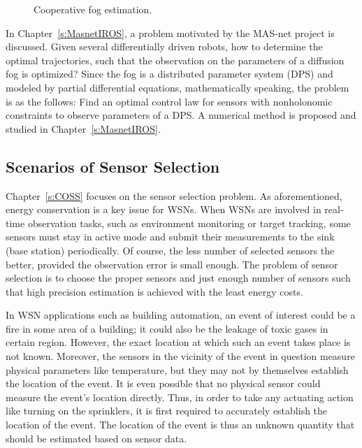 \begin{figure}
\centering
\caption{Cooperative fog estimation.\label{f:CoopFog}}
\end{figure}

In Chapter~\ref{s:MasnetIROS}, a problem motivated by the MAS-net project is discussed. Given several differentially driven robots, how to determine the optimal trajectories, such that the observation on the parameters of a diffusion fog is optimized? Since the fog is a distributed parameter system (DPS) and modeled by partial differential equations, mathematically speaking, the problem is as the follows: Find an optimal control law for sensors with nonholonomic constraints to observe parameters of a DPS. A numerical method is proposed and studied in Chapter~\ref{s:MasnetIROS}.



\subsection{Scenarios of Sensor Selection}
Chapter~\ref{s:COSS} focuses on the sensor selection problem. As aforementioned, energy conservation is a key issue for WSNs. When WSNs are involved in real-time observation tasks, such as environment monitoring or target tracking, some sensors must stay in active mode and submit their measurements to the sink (base station) periodically. Of course, the less number of selected sensors the better, provided the observation error is small enough. The problem of sensor selection is to choose the proper sensors and just enough number of sensors such that high precision estimation is achieved with the least energy costs.


In WSN applications such as building automation, an event
of interest could be a fire in some area of a building; it could also be the leakage of toxic gases in certain
region. However, the exact location at which such an
event takes place is not known. Moreover, the sensors in the
vicinity of the event in question measure physical parameters
like temperature, but they may not by themselves establish
the location of the event. It is even possible that no physical sensor could measure the event's location directly.
Thus, in order to take any actuating
action like turning on the sprinklers, it is first required to
accurately establish the location of the event. The location
of the event is thus an unknown quantity that should be
estimated based on sensor data.


